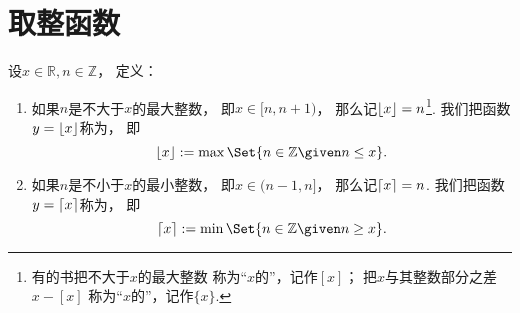 \section{取整函数}
\begin{definition}[取整函数]
设\(x\in\mathbb{R},
n\in\mathbb{Z}\)，
定义：\begin{enumerate}
	\item 如果\(n\)是不大于\(x\)的最大整数，
	即\(x\in[n,n+1)\)，
	那么记\(\lfloor x\rfloor=n\)\footnote{有的书把不大于\(x\)的最大整数
	称为“\(x\)的”，记作\([x]\)；
	把\(x\)与其整数部分之差\(x - [x]\)
	称为“\(x\)的”，记作\(\{x\}\).}.
	我们把函数\(y=\lfloor x\rfloor\)称为，
	即\begin{equation}
		\floor{x}
		\defeq
		\max\Set{ n\in\mathbb{Z} \given n \leq x }.
	\end{equation}

	\item 如果\(n\)是不小于\(x\)的最小整数，
	即\(x\in(n-1,n]\)，
	那么记\(\lceil x\rceil=n\).
	我们把函数\(y=\lceil x\rceil\)称为，
	即\begin{equation}
		\ceil{x}
		\defeq
		\min\Set{ n\in\mathbb{Z} \given n \geq x }.
	\end{equation}
\end{enumerate}
\end{definition}

